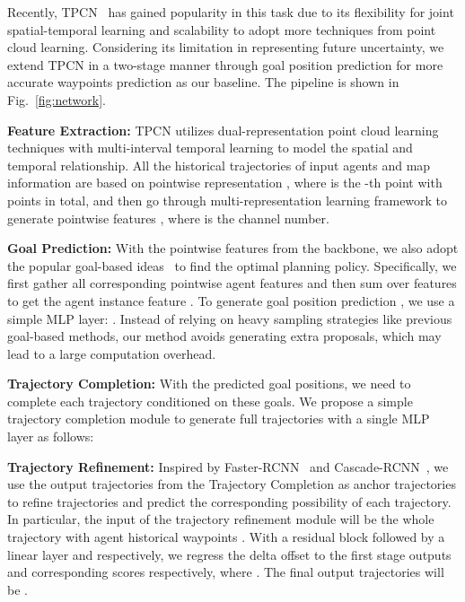 \documentclass[10pt,twocolumn,letterpaper]{article}
\begin{document}
Recently, TPCN~\cite{ye2021tpcn} has gained popularity in this task due to its flexibility for joint spatial-temporal learning and scalability to adopt more techniques from point cloud learning. Considering its limitation in representing future uncertainty, we extend TPCN in a two-stage manner through goal position prediction for more accurate waypoints prediction as our baseline. The pipeline is shown in Fig.~\ref{fig:network}. 

\textbf{Feature Extraction:} TPCN utilizes dual-representation point cloud learning techniques with multi-interval temporal learning to model the spatial and temporal relationship. All the historical trajectories of input agents  and map information are based on pointwise representation , where 
 is the -th point with  points in total, and then go through multi-representation learning framework to generate pointwise features , where  is the channel number.


\textbf{Goal Prediction:} With the pointwise features from the backbone, we also adopt the popular goal-based ideas~\cite{gilles2021home,gu2021densetnt,zhao2020tnt} to find the optimal planning policy. Specifically, we first gather all corresponding pointwise agent features and then sum over features to get the agent instance feature . To generate  goal position prediction , we use a simple MLP layer: . 
Instead of relying on heavy sampling strategies like previous goal-based methods, our method avoids generating extra proposals, which may lead to a large computation overhead.

\textbf{Trajectory Completion:} With the predicted goal positions, we need to complete each trajectory conditioned on these goals. We propose a simple trajectory completion module to generate  full trajectories  with a single MLP layer as follows:

 
\textbf{Trajectory Refinement:} Inspired by Faster-RCNN~\cite{Ren2015Faster} and Cascade-RCNN~\cite{cai2018cascade}, we use the output trajectories from the Trajectory Completion as anchor trajectories to refine trajectories and predict the corresponding possibility of each trajectory. In particular, the input of the trajectory refinement module will be the whole trajectory with agent historical waypoints . With a residual block followed by a linear layer  and  respectively, we regress the delta offset to the first stage outputs  and corresponding scores  respectively, where . The final output trajectories will be .
\end{document}
